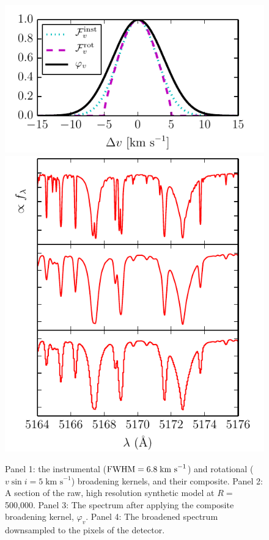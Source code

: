 \documentclass[iop,floatfix]{emulateapj}
\newcommand{\kms}{ \textrm{km s}^{-1} }
\begin{document}
\begin{figure}[!t]
\begin{center}
  \includegraphics{figs/kernels.pdf}
  \includegraphics{figs/high2low.pdf}
  \caption{Panel 1: the instrumental (${\rm FWHM} =6.8\;\kms$) and rotational ($v \sin i = 5\;\kms$) broadening kernels, and their composite. Panel 2: A section of the raw, high resolution synthetic model at $R=$500,000. Panel 3: The spectrum after applying the composite broadening kernel, $\varphi_v$. Panel 4: The broadened spectrum downsampled to the pixels of the detector.}
\label{fig:broadening}
\end{center}
\end{figure}
\end{document}
